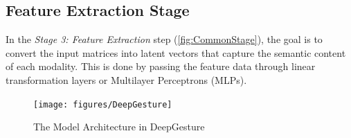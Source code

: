 \subsection{Feature Extraction Stage}
\label{subsec:feature_extraction}

In the \textit{Stage 3: Feature Extraction} step (\autoref{fig:CommonStage}), the goal is to convert the input matrices into latent vectors that capture the semantic content of each modality. This is done by passing the feature data through linear transformation layers or Multilayer Perceptrons (MLPs).


\begin{figure}[t]
	\centering
	\texttt{[image: figures/DeepGesture]}
	\caption{The Model Architecture in DeepGesture}
	\Description{}
	\label{fig:DeepGesture}
\end{figure}



